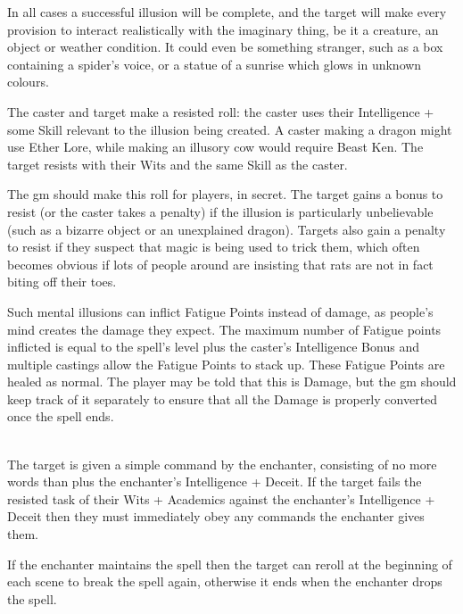 \begin{multicols}{2}
In all cases a successful illusion will be complete, and the target will make every provision to interact realistically with the imaginary thing, be it a creature, an object or weather condition. It could even be something stranger, such as a box containing a spider's voice, or a statue of a sunrise which glows in unknown colours.

The caster and target make a resisted roll: the caster uses their Intelligence + some Skill relevant to the illusion being created. A caster making a dragon might use Ether Lore, while making an illusory cow would require Beast Ken. The target resists with their Wits and the same Skill as the caster.

The \gls{gm} should make this roll for players, in secret. The target gains a bonus to resist (or the caster takes a penalty) if the illusion is particularly unbelievable (such as a bizarre object or an unexplained dragon). Targets also gain a penalty to resist if they suspect that magic is being used to trick them, which often becomes obvious if lots of people around are insisting that rats are not in fact biting off their toes.

Such mental illusions can inflict Fatigue Points instead of damage, as people's mind creates the damage they expect.
The maximum number of Fatigue points inflicted is equal to the spell's level plus the caster's Intelligence Bonus and multiple castings allow the Fatigue Points to stack up.
These Fatigue Points are healed as normal.
The player may be told that this is Damage, but the \gls{gm} should keep track of it separately to ensure that all the Damage is properly converted once the spell ends.

\spelllevel

\\
The target is given a simple command by the enchanter, consisting of no more words than  plus the enchanter's Intelligence + Deceit. If the target fails the resisted task of their Wits + Academics against the enchanter's Intelligence + Deceit then they must immediately obey any commands the enchanter gives them.

If the enchanter maintains the spell then the target can reroll at the beginning of each scene to break the spell again, otherwise it ends when the enchanter drops the spell.

\end{multicols}

